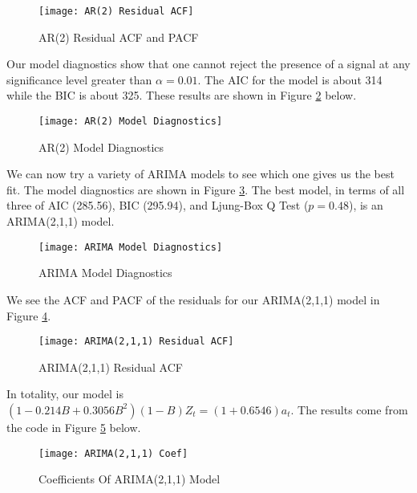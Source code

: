 \documentclass[12pt, letterpaper]{article}
\theoremstyle{definition}
\numberwithin{equation}{section}
\newcommand{\+}[1]{+_{\scalebox{.375}{#1}}}
\newcommand{\1}{\mathbbm{1}}
\begin{document}
\begin{figure}[H]
	\centering
	\texttt{[image: AR(2) Residual ACF]}
	\caption{AR(2) Residual ACF and PACF}
	\label{AR(2) Residual ACF}
\end{figure}

Our model diagnostics show that one cannot reject the presence of a signal at any significance level greater than $\alpha=0.01$. The AIC for the model is about 314 while the BIC is about 325. These results are shown in Figure \ref{AR(2) Model Diagnostics} below.

\begin{figure}[H]
	\centering
	\texttt{[image: AR(2) Model Diagnostics]}
	\caption{AR(2) Model Diagnostics}
	\label{AR(2) Model Diagnostics}
\end{figure}

We can now try a variety of ARIMA models to see which one gives us the best fit. The model diagnostics are shown in Figure \ref{ARIMA Model Diagnostics}. The best model, in terms of all three of AIC (285.56), BIC (295.94), and Ljung-Box Q Test ($p=0.48$), is an ARIMA(2,1,1) model.


\begin{figure}[H]
	\centering
	\texttt{[image: ARIMA Model Diagnostics]}
	\caption{ARIMA Model Diagnostics}
	\label{ARIMA Model Diagnostics}
\end{figure} 

We see the ACF and PACF of the residuals for our ARIMA(2,1,1) model in Figure \ref{ARIMA(2,1,1) Residual ACF}.

\begin{figure}[H]
	\centering
	\texttt{[image: ARIMA(2,1,1) Residual ACF]}
	\caption{ARIMA(2,1,1) Residual ACF}
	\label{ARIMA(2,1,1) Residual ACF}
\end{figure} 



\vspace{\baselineskip}
\noindent\textbf{}
\vspace{\baselineskip}

In totality, our model is $(1-0.214B+0.3056B^2)(1-B)Z_t=(1+0.6546)a_t$. The results come from the code in Figure \ref{ARIMA(2,1,1) Coef} below.

\begin{figure}[H]
	\centering
	\texttt{[image: ARIMA(2,1,1) Coef]}
	\caption{Coefficients Of ARIMA(2,1,1) Model}
	\label{ARIMA(2,1,1) Coef}
\end{figure}
\end{document}
